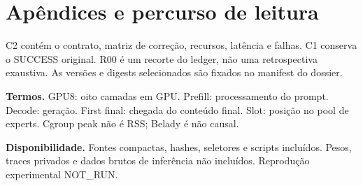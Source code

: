 \section{Apêndices e percurso de leitura}
C2 contém o contrato, matriz de correção, recursos, latência e falhas. C1 conserva o SUCCESS original. R00 é um recorte do ledger, não uma retrospectiva exaustiva. As versões e digests selecionados são fixados no manifest do dossier.

\textbf{Termos.} GPU8: oito camadas em GPU. Prefill: processamento do prompt. Decode: geração. First final: chegada do conteúdo final. Slot: posição no pool de experts. Cgroup peak não é RSS; Belady é não causal.   

\textbf{Disponibilidade.} Fontes compactas, hashes, seletores e scripts incluídos. Pesos, traces privados e dados brutos de inferência não incluídos. Reprodução experimental NOT\_RUN.
